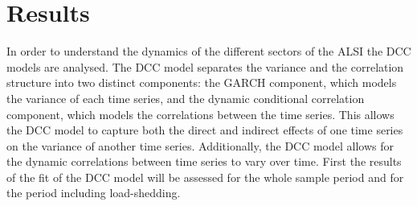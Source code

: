 \documentclass[11pt,preprint, authoryear]{elsarticle}
\let\origtable\table
\let\endorigtable\endtable
\renewenvironment{table}[1][2] {
    \expandafter\origtable\expandafter[H]
} {
    \endorigtable
}
\numberwithin{equation}{section}
\numberwithin{figure}{section}
\numberwithin{table}{section}
\begin{document}
\begin{table}[H]

\caption{\label{tab:univar}Univariate GJR GARCH Coefficients \label{univar}}
\centering
{}
\end{table}

\hypertarget{results}{%
\section{Results}\label{results}}

In order to understand the dynamics of the different sectors of the ALSI
the DCC models are analysed. The DCC model separates the variance and
the correlation structure into two distinct components: the GARCH
component, which models the variance of each time series, and the
dynamic conditional correlation component, which models the correlations
between the time series. This allows the DCC model to capture both the
direct and indirect effects of one time series on the variance of
another time series. Additionally, the DCC model allows for the dynamic
correlations between time series to vary over time. First the results of
the fit of the DCC model will be assessed for the whole sample period
and for the period including load-shedding.
\end{document}
